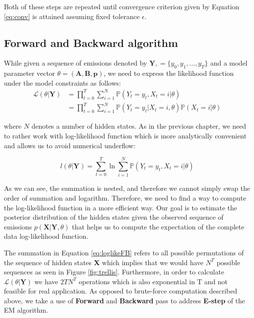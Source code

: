 Both of these steps are repeated until convergence criterion given by Equation \ref{eq:conv} is attained assuming fixed tolerance $\epsilon$.

\subsection{Forward and Backward algorithm}

While given a sequence of emissions denoted by $\textbf{Y}, = \{y_0,y_1,\ldots,y_T\}$ and a model parameter vector $\theta = (\textbf{A},\textbf{B},\textbf{p})$, 
we need to express the likelihood function under the model constraints as follows:
\begin{align}
    \mathcal{L}( \theta| \textbf{Y}) & = \prod\limits_{t=0}^T \sum\limits_{i=1}^N  \mathbb{P}(Y_t = y_t, X_t = i| \theta) \\
                                     & = \prod\limits_{t=0}^T \sum\limits_{i=1}^N  \mathbb{P}(Y_t = y_t | X_t = i, \theta) \mathbb{P}(X_t=i|\theta)
\end{align}

where $N$ denotes a number of hidden states. As in the previous chapter, we need to rather work with log-likelihood function which is more analytically convenient 
and allows us to avoid numerical underflow:

\begin{equation} \label{eq:loglikeFB} 
    l(\theta| \textbf{Y}) = \sum\limits_{t=0}^T \ln \sum\limits_{i=1}^N  \mathbb{P}(Y_t = y_t , X_t = i|\theta)
\end{equation}

As we can see, the summation is nested, and therefore we cannot simply swap the order of summation and logarithm. Therefore, we need to find a way to compute the log-likelihood function 
in a more efficient way. Our goal is to estimate the posterior distribution of the hidden states given the observed sequence of emissions $p(\textbf{X}|\textbf{Y},\theta)$
that helps us to compute the expectation of the complete data log-likelihood function.

The summation in Equation \ref{eq:loglikeFB} refers to all possible permutations of the sequence of hidden states \textbf{X} 
which implies that we would have $N^T$ possible sequences as seen in Figure \ref{fig:trellis}. Furthermore, in order to calculate $\mathcal{L}( \theta| \textbf{Y})$ we have $2TN^T$ 
operations which is also exponential in T and not feasible for real application. As opposed to brute-force 
computation described above, we take a use of \textbf{Forward} and \textbf{Backward} pass to address \textbf{E-step} of the EM algorithm.

